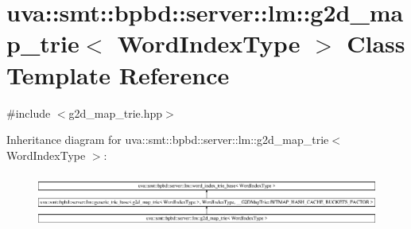 \hypertarget{classuva_1_1smt_1_1bpbd_1_1server_1_1lm_1_1g2d__map__trie}{}\section{uva\+:\+:smt\+:\+:bpbd\+:\+:server\+:\+:lm\+:\+:g2d\+\_\+map\+\_\+trie$<$ Word\+Index\+Type $>$ Class Template Reference}
\label{classuva_1_1smt_1_1bpbd_1_1server_1_1lm_1_1g2d__map__trie}


{\ttfamily \#include $<$g2d\+\_\+map\+\_\+trie.\+hpp$>$}

Inheritance diagram for uva\+:\+:smt\+:\+:bpbd\+:\+:server\+:\+:lm\+:\+:g2d\+\_\+map\+\_\+trie$<$ Word\+Index\+Type $>$\+:\begin{figure}[H]
\begin{center}
\leavevmode
\includegraphics[height=1.791045cm]{classuva_1_1smt_1_1bpbd_1_1server_1_1lm_1_1g2d__map__trie}
\end{center}
\end{figure}
